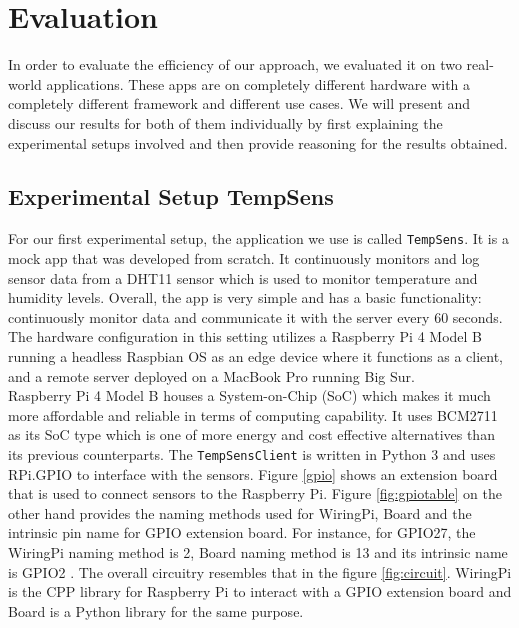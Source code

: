\chapter{Evaluation}
In order to evaluate the efficiency of our approach, we evaluated it on two real-world applications. These apps 
are on completely different hardware with a completely different framework and different use cases. We will 
present and discuss our results for both of them individually by first explaining the experimental setups involved 
and then provide reasoning for the results obtained. \\

\section{Experimental Setup \textemdash TempSens}
For our first experimental setup, the application we use is called \texttt{TempSens}. It is a mock app that 
was developed from scratch. It continuously monitors and log sensor data from a DHT11 sensor which is used 
to monitor temperature and humidity levels. Overall, 
the app is very simple and has a basic functionality: continuously monitor data and communicate it with the server 
every 60 seconds. The hardware configuration in this setting utilizes a Raspberry Pi 4 Model B running 
a headless Raspbian OS as an edge device where it functions as a client, and a remote server deployed on a MacBook 
Pro running Big Sur. \\
Raspberry Pi 4 Model B houses a System-on-Chip (SoC) which makes it much more affordable and reliable in terms of 
computing capability. It uses BCM2711 as its SoC type which is one of more energy and cost effective alternatives 
than its previous counterparts. The \texttt{TempSensClient} is written in Python 3 and uses RPi.GPIO to interface 
with the sensors. Figure \ref{gpio} shows an extension board that is used to connect sensors to the Raspberry Pi. 
Figure \ref{fig:gpiotable} on the other hand provides the naming methods used for WiringPi, Board and the 
intrinsic pin name for GPIO extension board. For instance, for GPIO27, the WiringPi naming method is 2, Board naming 
method is 13 and its intrinsic name is GPIO2 \cite{gpio}. The overall circuitry resembles that in the figure \ref{fig:circuit}.
WiringPi \cite{wiring} is the CPP library for Raspberry Pi to interact with a GPIO extension board and Board 
\cite{pypi} is a Python library 
for the same purpose. 


